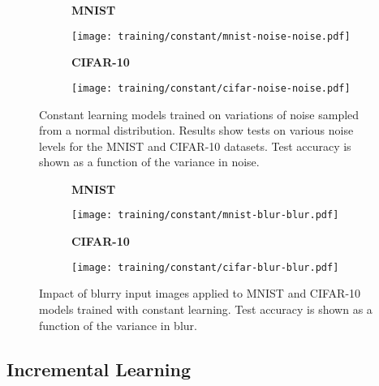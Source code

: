 \documentclass[conference]{IEEEtran}
\begin{document}
\begin{figure}[H]
    \centering
    \begin{subfigure}[h]{0.30\textwidth}
        \centering
        \textbf{MNIST}\par\medskip
        \texttt{[image: training/constant/mnist-noise-noise.pdf]}
        \caption{} 
        \label{fig:constant-mnist-noise}
    \end{subfigure}
    \quad
    \begin{subfigure}[h]{0.30\textwidth}  
        \centering 
        \textbf{CIFAR-10}\par\medskip
        \texttt{[image: training/constant/cifar-noise-noise.pdf]}
        \caption{} 
        \label{fig:constant-cifar-noise}
    \end{subfigure}
    \captionsetup{width=0.80\linewidth}
    \caption{Constant learning models trained on variations of noise sampled from a normal distribution. Results show tests on various noise levels for the MNIST and CIFAR-10 datasets. Test accuracy is shown as a function of the variance in noise.} 
    \label{fig:constant-noise}
\end{figure}

\begin{figure}[H]
    \centering
    \begin{subfigure}[h]{0.30\textwidth}
        \centering
        \textbf{MNIST}\par\medskip
        \texttt{[image: training/constant/mnist-blur-blur.pdf]}
        \caption{} 
        \label{fig:constant-mnist-blur}
    \end{subfigure}
    \quad
    \begin{subfigure}[h]{0.30\textwidth}  
        \centering 
        \textbf{CIFAR-10}\par\medskip
        \texttt{[image: training/constant/cifar-blur-blur.pdf]}
        \caption{} 
        \label{fig:constant-cifar-blur}
    \end{subfigure}
    \captionsetup{width=0.80\linewidth}
    \caption{Impact of blurry input images applied to MNIST and CIFAR-10 models trained with constant learning. Test accuracy is shown as a function of the variance in blur.} 
    \label{fig:constant-blur}
\end{figure}

\subsection{Incremental Learning}
\end{document}
